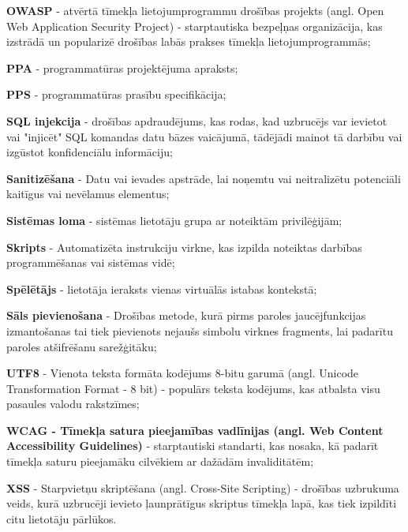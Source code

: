 \textbf{OWASP} - atvērtā tīmekļa lietojumprogrammu drošības projekts (angl. Open Web Application Security Project) - starptautiska bezpeļņas organizācija, kas izstrādā un popularizē drošības labās prakses tīmekļa lietojumprogrammās;

\textbf{PPA} - programmatūras projektējuma apraksts;

\textbf{PPS} - programmatūras prasību specifikācija;

\textbf{SQL injekcija} - drošības apdraudējums, kas rodas, kad uzbrucējs var ievietot vai "injicēt" SQL komandas datu bāzes vaicājumā, tādējādi mainot tā darbību vai izgūstot konfidenciālu informāciju;

\textbf{Sanitizēšana} - Datu vai ievades apstrāde, lai noņemtu vai neitralizētu potenciāli kaitīgus vai nevēlamus elementus;

\textbf{Sistēmas loma} - sistēmas lietotāju grupa ar noteiktām privilēģijām;

\textbf{Skripts} - Automatizēta instrukciju virkne, kas izpilda noteiktas darbības programmēšanas vai sistēmas vidē;

\textbf{Spēlētājs} - lietotāja ieraksts vienas virtuālās istabas kontekstā;

\textbf{Sāls pievienošana} - Drošības metode, kurā pirms paroles jaucējfunkcijas izmantošanas tai tiek pievienots nejaušs simbolu virknes fragments, lai padarītu paroles atšifrēšanu sarežģitāku;

\textbf{UTF8} - Vienota teksta formāta kodējums 8-bitu garumā (angl. Unicode Transformation Format - 8 bit) - populārs teksta kodējums, kas atbalsta visu pasaules valodu rakstzīmes;

\textbf{WCAG - Tīmekļa satura pieejamības vadlīnijas (angl. Web Content Accessibility Guidelines)} - starptautiski standarti, kas nosaka, kā padarīt tīmekļa saturu pieejamāku cilvēkiem ar dažādām invaliditātēm;

\textbf{XSS} - Starpvietņu skriptēšana (angl. Cross-Site Scripting) - drošības uzbrukuma veids, kurā uzbrucēji ievieto ļaunprātīgus skriptus tīmekļa lapā, kas tiek izpildīti citu lietotāju pārlūkos.
